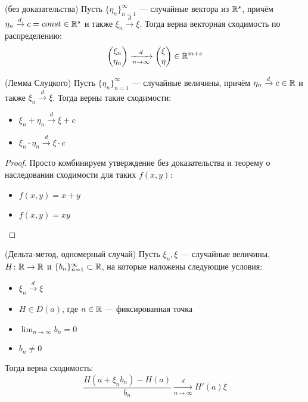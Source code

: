\begin{proposition} (без доказательства)
	Пусть $\{\eta_n\}_{n = 1}^\infty$ --- случайные вектора из $\mathbb{R}^s$, причём $\eta_n \xrightarrow{d} c = const \in \mathbb{R}^s$ и также $\xi_n \xrightarrow{d} \xi$. Тогда верна векторная сходимость по распределению:
	\[
		\begin{pmatrix}
			\xi_n
			\\
			\eta_n
		\end{pmatrix}
		\xrightarrow[n \to \infty]{d}
		\begin{pmatrix}
			\xi
			\\
			\eta
		\end{pmatrix}
		\in \mathbb{R}^{m + s}
	\] 
\end{proposition}

\begin{corollary} (Лемма Слуцкого)
	Пусть $\{\eta_n\}_{n = 1}^\infty$ --- случайные величины, причём $\eta_n \xrightarrow{d} c \in \mathbb{R}$ и также $\xi_n \xrightarrow{d} \xi$. Тогда верны такие сходимости:
	\begin{itemize}
		\item \(\xi_n + \eta_n \xrightarrow{d} \xi + c\)
		
		\item \(\xi_n \cdot \eta_n \xrightarrow{d} \xi \cdot c\)
	\end{itemize}
\end{corollary}

\begin{proof}
	Просто комбинируем утверждение без доказательства и теорему о наследовании сходимости для таких $f(x, y)$:
	\begin{itemize}
		\item $f(x, y) = x + y$
		
		\item $f(x, y) = xy$
	\end{itemize}
\end{proof}

\begin{theorem} (Дельта-метод, одномерный случай)
	Пусть $\xi_n, \xi$ --- случайные величины, $H \colon \mathbb{R} \to \mathbb{R}$ и $\{b_n\}_{n = 1}^\infty \subset \mathbb{R}$, на которые наложены следующие условия:
	\begin{itemize}
		\item $\xi_n \xrightarrow{d} \xi$
		
		\item $H \in D(a)$, где $a \in \mathbb{R}$ --- фиксированная точка
		
		\item $\lim_{n \to \infty} b_n = 0$
		
		\item $b_n \neq 0$
	\end{itemize}
	Тогда верна сходимость:
	\[
		\frac{H(a + \xi_nb_n) - H(a)}{b_n} \xrightarrow[n \to \infty]{d} H'(a)\xi
	\]
\end{theorem}

